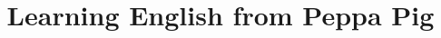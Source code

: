 \documentclass[a4paper]{article}
\begin{document}
\title{Learning English from Peppa Pig}

\author{}
\date{}


\maketitle
\begin{abstract}
\end{abstract}






%



\end{document}
